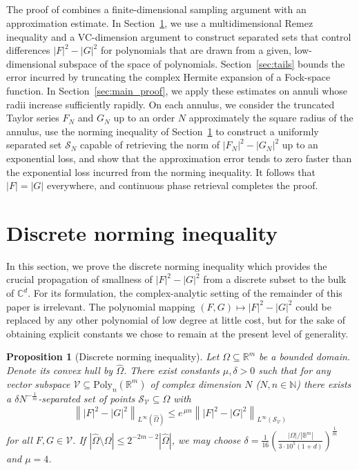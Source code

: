 \documentclass[11pt]{amsart}
\newtheorem{proposition}[theorem]{Proposition}
\newcommand{\Polyn}[2]{\mathrm{Poly}_{#1}(#2)}
\begin{document}
\subsection{}
The proof of  combines a finite-dimensional sampling argument with an approximation estimate. In Section~\ref{sec:norming}, we use a multidimensional Remez inequality and a VC-dimension argument to construct separated sets that control differences $|F|^2-|G|^2$ for polynomials that are drawn from a given, low-dimensional subspace of the space of polynomials. Section~\ref{sec:tails} bounds the error incurred by truncating the complex Hermite expansion of a Fock-space function. In Section~\ref{sec:main_proof}, we apply these estimates on annuli whose radii increase sufficiently rapidly. On each annulus, we consider the truncated Taylor series $F_N$ and $G_N$ up to an order $N$ approximately the square radius of the annulus, use the norming inequality of Section~\ref{sec:norming} to construct a uniformly separated set $\mathcal S_N$ capable of retrieving the norm of $|F_N|^2-|G_N|^2$ up to an exponential loss, and show that the approximation error tends to zero faster than the exponential loss incurred from the norming inequality. It follows that $|F|=|G|$ everywhere, and continuous phase retrieval completes the proof.

\section{Discrete norming inequality}\label{sec:norming}

In this section, we prove the discrete norming inequality which provides the crucial propagation of smallness of $|F|^2-|G|^2$ from a discrete subset to the bulk of $\mathbb C^d$. For its formulation, the complex-analytic setting of the remainder of this paper is irrelevant. The polynomial mapping $(F,G) \mapsto |F|^2-|G|^2$ could be replaced by any other polynomial of low degree at little cost, but for the sake of obtaining explicit constants we chose to remain at the present level of generality.

\begin{proposition}[Discrete norming inequality]
\label{prop:norming}
Let $\Omega \subseteq \mathbb R^m$ be a bounded domain. Denote its convex hull by $\hat\Omega$. There exist constants \(\mu,\delta > 0\) such that for any vector subspace $\mathscr V \subseteq \Polyn{n}{\mathbb R^m}$ of complex dimension $N$ ($N,n \in \mathbb N$) there exists a $\delta N^{-\frac1{m}}$-separated set of points $\mathcal S_{\mathscr V} \subseteq \Omega$ with
\[
    \left\lVert |F|^2-|G|^2 \right\rVert_{L^\infty(\hat \Omega)}
    \le
    e^{\, \mu n}
    \left\lVert |F|^2-|G|^2 \right\rVert_{L^\infty(\mathcal S_{\mathscr V})}
\]
for all $F, G \in \mathscr V$. If $|\hat \Omega \setminus \Omega| \leq 2^{-2m-2}|\hat \Omega|$, we may choose $\delta = \frac1{16} \left( \frac{|\Omega|/|\mathbb B^{m}|}{3\cdot 10^5 (1 + d)} \right)^{\frac1{m}}$ and $\mu = 4$.
\end{proposition}
\end{document}
